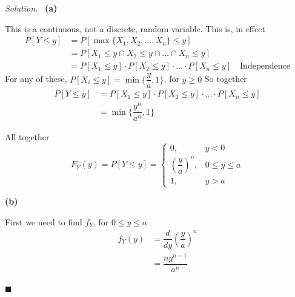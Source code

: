 \documentclass[11pt]{article}
\newenvironment{solution}
{\par\medskip\noindent\textit{Solution.}\ }
{\hfill$\blacksquare$\par\medskip}
\begin{document}
    \begin{solution}
        \textbf{(a)}

        This is a continuous, not a discrete, random variable.
        This is, in effect
        \begin{align*}
            P[Y \le y] &= P[\max\{X_1, X_2, \ldots, X_n\} \le y] \\
            &= P[X_1 \le y \cap X_2 \le y \cap \ldots \cap X_n \le y] \\
            &= P[X_1 \le y] \cdot P[X_2 \le y] \cdot \ldots \cdot P[X_n \le y] \quad \text{Independence}
        \end{align*}
        For any of these, $P[X_i \le y] = \min\{\dfrac{y}{a}, 1\}$, for $y \ge 0$
        So together
        \begin{align*}
            P[Y \le y] &= P[X_1 \le y] \cdot P[X_2 \le y] \cdot \ldots \cdot P[X_n \le y] \\
            &= \min\{\dfrac{y^n}{a^n}, 1\}
        \end{align*}

        All together
        \[
            F_Y(y) = P[Y \le y] = \begin{cases}
                             0, & y < 0 \\
                             \left(\dfrac{y}{a}\right)^n, & 0 \le y \le a \\
                             1, & y > a
            \end{cases}
        \]

        \vspace{1em}
        \textbf{(b)}

        First we need to find $f_Y$, for $0 \le y \le a$
        \begin{align*}
            f_Y(y) &= \dfrac{d}{dy} \left(\dfrac{y}{a}\right)^n \\
            &= \dfrac{ny^{n-1}}{a^n}
        \end{align*}


\end{solution}
\end{document}
